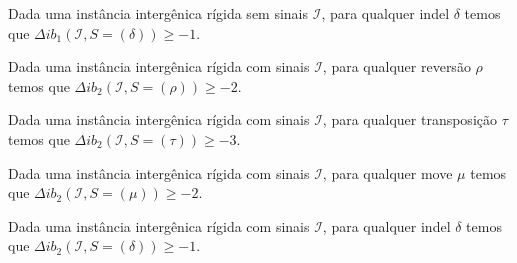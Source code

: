 \begin{lemma}\label{lemma:KWIVENLG}
Dada uma instância intergênica rígida sem sinais $\mathcal{I}$, para qualquer indel $\delta$ temos que $\Delta ib_1(\mathcal{I}, S = (\delta)) \ge -1$.
\end{lemma}

\begin{lemma}\label{lemma:IKBNJWMY}
Dada uma instância intergênica rígida com sinais $\mathcal{I}$, para qualquer reversão $\rho$ temos que $\Delta ib_2(\mathcal{I}, S = (\rho)) \ge -2$.
\end{lemma}

\begin{lemma}\label{lemma:MYVALTSG}
Dada uma instância intergênica rígida com sinais $\mathcal{I}$, para qualquer transposição $\tau$ temos que $\Delta ib_2(\mathcal{I}, S = (\tau)) \ge -3$.
\end{lemma}

\begin{lemma}\label{lemma:LSPSMYMM}
Dada uma instância intergênica rígida com sinais $\mathcal{I}$, para qualquer move $\mu$ temos que $\Delta ib_2(\mathcal{I}, S = (\mu)) \ge -2$.
\end{lemma}

\begin{lemma}\label{lemma:KXIYYHHL}
Dada uma instância intergênica rígida com sinais $\mathcal{I}$, para qualquer indel $\delta$ temos que $\Delta ib_2(\mathcal{I}, S = (\delta)) \ge -1$.
\end{lemma}

